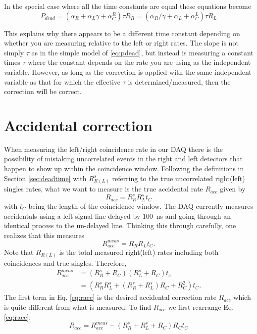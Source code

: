 \documentclass[12pt]{article}
\begin{document}
In the special case where all the time constants are equal these equations become
\[
P_{dead}=\left(\alpha_R+\alpha_L\gamma+\alpha_C^R\right)\tau R_R=\left(\alpha_R/\gamma+\alpha_L+\alpha^L_C\right)\tau R_L
\]

This explains why there appears to be a different time constant depending on whether you are measuring relative to the left or right rates. The slope is not simply $\tau$ as in the simple model of \ref{eq:pdead}, but instead is measuring a constant times $\tau$ where the constant depends on the rate you are using as the independent variable. However, as long as the correction is applied with the same independent variable as that for which the effective $\tau$ is determined/measured, then the correction will be correct.

\section{Accidental correction}
When measuring the left/right coincidence rate in our DAQ there is the possibility of mistaking uncorrelated events in the right and left detectors that happen to show up within the coincidence window. Following the definitions in Section \ref{sec:deadtime} with $R_{R(L)}^s$ referring to the true uncorrelated right(left) singles rates, what we want to measure is the true accidental rate $R_{acc}$ given by
\begin{equation}
R_{acc}=R_R^sR_L^st_C
\end{equation}
with $t_C$ being the length of the coincidence window. The DAQ currently measures accidentals using a left signal line delayed by 100~ns and going through an identical process to the un-delayed line. Thinking this through carefully, one realizes that this measures
\begin{equation}
\label{eq:raccmeas}
R_{acc}^{meas}=R_RR_Lt_C.
\end{equation}
Note that $R_{R(L)}$ is the total measured right(left) rates including both coincidences and true singles. Therefore,
\begin{align}
R_{acc}^{meas}&=(R_R^s+R_C)(R_L^s+R_C)t_c\\
&=\left(R_R^sR_L^s+(R_R^s+R_L^s)R_C+R_C^2\right)t_C\label{eq:racc}.
\end{align}
The first term in Eq. \ref{eq:racc} is the desired accidental correction rate $R_{acc}$ which is quite different from what is measured. To find $R_{acc}$ we first rearrange Eq. \ref{eq:racc}:
\begin{equation}
\label{eq:raccrearranged}
R_{acc}=R^{meas}_{acc}-\left(R_R^s+R_L^s+R_C\right)R_Ct_C
\end{equation}
\end{document}
